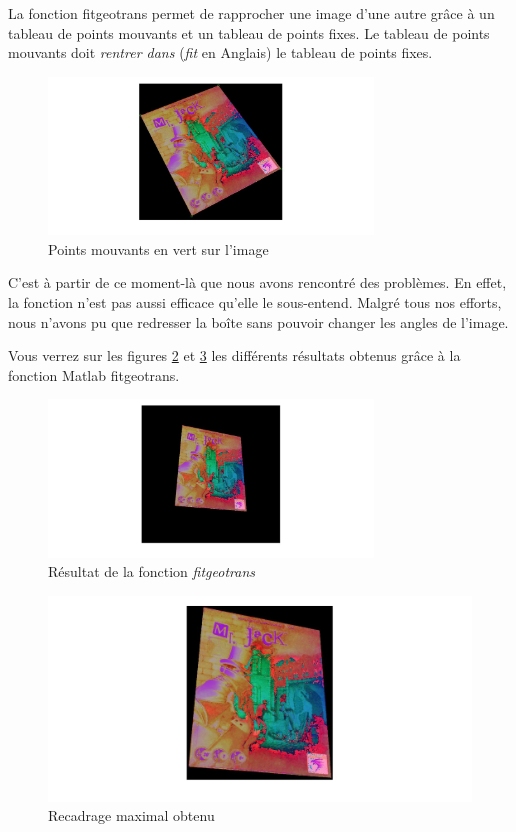 \documentclass{st50_template}
\begin{document}
La fonction fitgeotrans permet de rapprocher une image d'une autre grâce à un tableau de points mouvants et un tableau de points fixes. Le tableau de points mouvants doit \emph{rentrer dans} (\emph{fit} en Anglais) le tableau de points fixes.

\begin{figure}[ht]
    \centering
    \includegraphics[width=0.77\textwidth]{images/movingPoints.jpg}
    \caption{Points mouvants en vert sur l'image}
    \label{movingPoints}
\end{figure}


C'est à partir de ce moment-là que nous avons rencontré des problèmes. En effet, la fonction n'est pas aussi efficace qu'elle le sous-entend. Malgré tous nos efforts, nous n'avons pu que redresser la boîte sans pouvoir changer les angles de l'image.

Vous verrez sur les figures \ref{fitgeotrans} et \ref{transRecadre} les différents résultats obtenus grâce à la fonction Matlab fitgeotrans.

\begin{figure}[ht]
    \centering
    \includegraphics[width=0.77\textwidth]{images/fitgeotrans.jpg}
    \caption{Résultat de la fonction \emph{fitgeotrans}}
    \label{fitgeotrans}
\end{figure}

\begin{figure}[ht]
    \centering
    \includegraphics[width=\textwidth]{images/transRecadre.jpg}
    \caption{Recadrage maximal obtenu}
    \label{transRecadre}
\end{figure}
\end{document}

